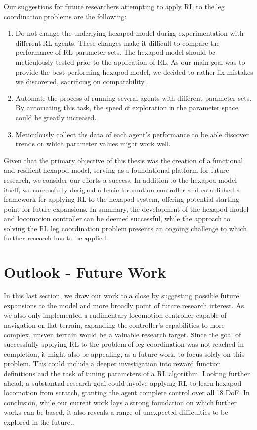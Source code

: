 Our suggestions for future researchers attempting to apply RL to the leg coordination problems are the following:
\begin{enumerate}
	\item Do not change the underlying hexapod model during experimentation with different RL agents. 
	These changes make it difficult to compare the performance of RL parameter sets.
	The hexapod model should be meticulously tested prior to the application of RL.
	As our main goal was to provide the best-performing hexapod model, we decided to rather fix mistakes we discovered, sacrificing on comparability .
	
	\item Automate the process of running several agents with different parameter sets. 
	By automating this task, the speed of exploration in the parameter space could be greatly increased.
	
	\item Meticulously collect the data of each agent's performance to be able discover trends on which parameter values might work well.
	
\end{enumerate}

Given that the primary objective of this thesis was the creation of a functional and resilient hexapod model, serving as a foundational platform for future research, we consider our efforts a success.
In addition to the hexapod model itself, we successfully designed a basic locomotion controller and established a framework for applying RL to the hexapod system, offering potential starting point for future expansions.
In summary, the development of the hexapod model and locomotion controller can be deemed successful, while the approach to solving the RL leg coordination problem presents an ongoing challenge to which further research has to be applied.


\section{Outlook - Future Work}

In this last section, we draw our work to a close by suggesting possible future expansions to the model and more broadly point of future research interest.
As we also only implemented a rudimentary locomotion controller capable of navigation on flat terrain, expanding the controller's capabilities to more complex, uneven terrain would be a valuable research target.
Since the goal of successfully applying RL to the problem of leg coordination was not reached in completion, it might also be appealing, as a future work, to focus solely on this problem.
This could include a deeper investigation into reward function definitions and the task of tuning parameters of a RL algorithm.
Looking further ahead, a substantial research goal could involve applying RL to learn hexapod locomotion from scratch, granting the agent complete control over all 18 DoF.
In conclusion, while our current work lays a strong foundation on which further works can be based, it also reveals a range of unexpected difficulties to be explored in the future..


